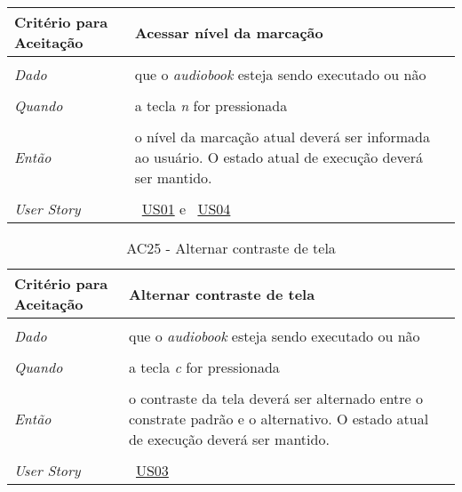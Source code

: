 \begin{apendicesenv}
\begin{table}[ht]
\begin{center}
\begin{tabularx}{\textwidth}{|lX|l|}
\hline
\textbf{Critério para Aceitação} & Acessar nível da marcação \\
\hline
 & \\			
\textit{Dado} & que o \textit{audiobook} esteja sendo executado ou não \\
 & \\
\textit{Quando} & a tecla \textit{n} for pressionada \\
 & \\
\textit{Então} & o nível da marcação atual deverá ser informada ao usuário. O estado atual de execução deverá ser mantido. \\
 & \\
\hline
\textit{User Story} & ~\hyperref[tab:us01]{US01} e ~\hyperref[tab:us01]{US04} \\
\hline

\end{tabularx}
\end{center}
\label{tab:us01a24}
\end{table}


\begin{table}[ht]
\centering
\caption{AC25 - Alternar contraste de tela}
\vspace{0.1cm}
\begin{center}
\begin{tabularx}{\textwidth}{|lX|l|}

\hline
\textbf{Critério para Aceitação} & Alternar contraste de tela \\
\hline
 & \\			
\textit{Dado} & que o \textit{audiobook} esteja sendo executado ou não \\
 & \\
\textit{Quando} & a tecla \textit{c} for pressionada \\
 & \\
\textit{Então} & o contraste da tela deverá ser alternado entre o constrate padrão e o alternativo. O estado atual de execução deverá ser mantido. \\
 & \\
\hline
\textit{User Story} & ~\hyperref[tab:us01]{US03} \\
\hline

\end{tabularx}
\end{center}
\label{tab:us01a25}
\end{table}

\end{apendicesenv}
